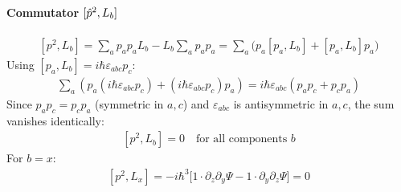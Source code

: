 \documentclass[letterpaper,10pt,english]{jupyterBook}
\begin{document}
\paragraph{Commutator \protect\([\hat{p}^2, L_b]\protect\)}
\label{\detokenize{ch/quantum-mechanics/atom-models/schrodinger-notes:commutator-hat-p-2-l-b}}\label{\detokenize{ch/quantum-mechanics/atom-models/schrodinger-notes:quantum-mechanics-atom-models-schrodinger-notes-commutation-l-p2}}\begin{equation*}
\begin{split}[p^2, L_b] = \sum_a p_a p_a L_b - L_b \sum_a p_a p_a = \sum_a \Big( p_a [p_a, L_b] + [p_a, L_b] p_a \Big)\end{split}
\end{equation*}
\sphinxAtStartPar
Using \([p_a, L_b] = i\hbar \varepsilon_{abc} p_c\):
\begin{equation*}
\begin{split}\sum_a \left( p_a (i\hbar \varepsilon_{abc} p_c) + (i\hbar \varepsilon_{abc} p_c) p_a \right) = i\hbar \varepsilon_{abc} (p_a p_c + p_c p_a)\end{split}
\end{equation*}
\sphinxAtStartPar
Since \(p_a p_c = p_c p_a\) (symmetric in \(a, c\)) and \(\varepsilon_{abc}\) is antisymmetric in \(a, c\), the sum vanishes identically:
\begin{equation*}
\begin{split}[p^2, L_b] = 0 \quad \text{for all components } b\end{split}
\end{equation*}
\sphinxAtStartPar
{} For \(b = x\):
\begin{equation*}
\begin{split}[p^2, L_x] = -i\hbar^3 \Big[ 1 \cdot \partial_z \partial_y \Psi - 1 \cdot \partial_y \partial_z \Psi \Big] = 0\end{split}
\end{equation*}
\end{document}
